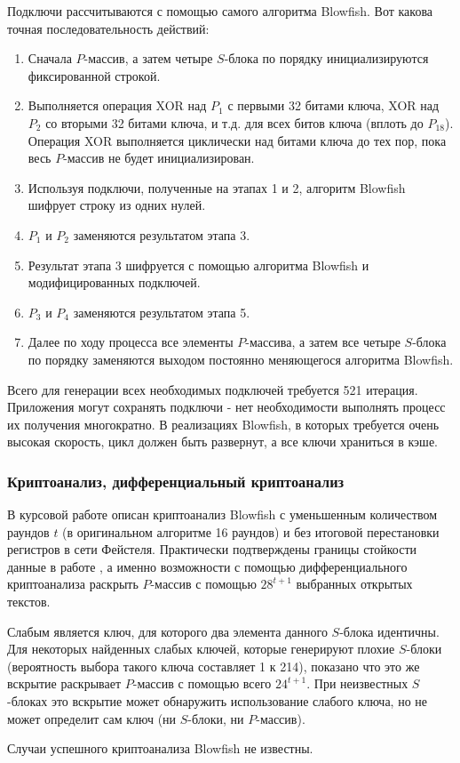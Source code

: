 Подключи рассчитываются с помощью самого алгоритма Blowfish. 
Вот какова точная последовательность действий:
\begin{enumerate}
\item Сначала $P$-массив, а затем четыре $S$-блока по порядку 
    инициализируются фиксированной строкой.
\item Выполняется операция XOR над $P_1$ с первыми 32 битами ключа, 
    XOR над $P_2$ со вторыми 32 битами ключа, и т.д. для всех битов 
    ключа (вплоть до $P_{18}$). Операция XOR выполняется циклически над 
    битами ключа до тех пор, пока весь $P$-массив не будет инициализирован.
\item Используя подключи, полученные на этапах 1 и 2, алгоритм 
    Blowfish шифрует строку из одних нулей.
\item $P_1$ и $P_2$ заменяются результатом этапа 3.
\item Результат этапа 3 шифруется с помощью алгоритма Blowfish 
    и модифицированных подключей.
\item $P_3$ и $P_4$ заменяются результатом этапа 5.
\item Далее по ходу процесса все элементы $P$-массива, а затем 
    все четыре $S$-блока по порядку заменяются выходом постоянно 
    меняющегося алгоритма Blowfish.
\end{enumerate}

Всего для генерации всех необходимых подключей требуется 521 
итерация. Приложения могут сохранять подключи - нет необходимости 
выполнять процесс их получения многократно.
В реализациях Blowfish, в которых требуется очень высокая скорость,
цикл должен быть развернут, а все ключи храниться в кэше.

\subsubsection{Криптоанализ, дифференциальный криптоанализ}

В курсовой работе описан криптоанализ Blowfish с уменьшенным 
количеством раундов $t$ (в оригинальном алгоритме 16 раундов) 
и без итоговой перестановки регистров в сети Фейстеля. 
Практически подтверждены границы
стойкости данные в работе \cite{vaudenay-blowfish}, а именно 
возможности с помощью дифференциального криптоанализа раскрыть 
$P$-массив с помощью $28^{t + 1}$ выбранных открытых текстов. 

Слабым является ключ, для которого 
два элемента данного $S$-блока идентичны.
Для некоторых найденных слабых ключей, которые 
генерируют плохие $S$-блоки 
(вероятность выбора такого ключа составляет 1 к 214), 
показано что это же вскрытие раскрывает 
$P$-массив с помощью всего $24^{t + 1}$. При неизвестных $S$-блоках это 
вскрытие может обнаружить использование слабого ключа, но не 
может определит сам ключ (ни $S$-блоки, ни $P$-массив).

Случаи успешного криптоанализа Blowfish не известны.
